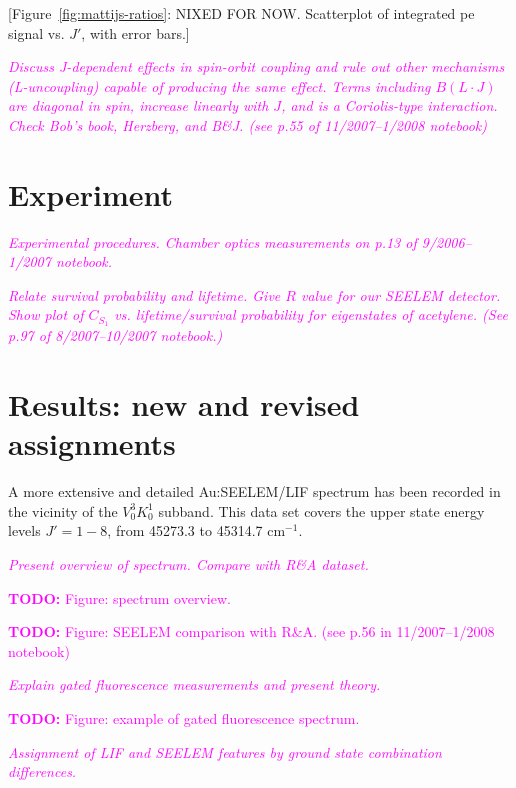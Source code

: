 \documentclass[12pt]{mitthesis}
\newcommand{\TODO} [1]{\textcolor{magenta}{\textbf{TODO:} #1}}
\newcommand{\POINT}[1]{\textcolor{magenta}{\emph{#1}}}
\newcommand{\rcm}{cm$^{-1}$}
\begin{document}
[Figure~\ref{fig:mattijs-ratios}: NIXED FOR NOW. Scatterplot of
integrated pe signal vs. $J'$, with error bars.]



\POINT{Discuss J-dependent effects in spin-orbit coupling and rule out
  other mechanisms (L-uncoupling) capable of producing the same
  effect. Terms including $B(L \cdot J)$ are diagonal in spin,
  increase linearly with $J$, and is a Coriolis-type interaction.
  Check Bob's book, Herzberg, and B\&J.  (see p.55 of 11/2007--1/2008
  notebook)}



\section{Experiment}

\POINT{Experimental procedures.  Chamber optics measurements on p.13
  of 9/2006--1/2007 notebook.}

\POINT{Relate survival probability and lifetime. Give $R$ value for
  our SEELEM detector.  Show plot of $C_{S_1}$ vs. lifetime/survival
  probability for eigenstates of acetylene.  (See p.97 of
  8/2007--10/2007 notebook.)}

\section{Results: new and revised assignments}

A more extensive and detailed Au:SEELEM/LIF spectrum has been recorded
in the vicinity of the $V^3_0K^1_0$ subband. This data set covers the
upper state energy levels $J'=1-8$, from 45273.3 to 45314.7 \rcm.

\POINT{Present overview of spectrum.  Compare with R\&A dataset.}

\TODO{Figure: spectrum overview.}

\TODO{Figure: SEELEM comparison with R\&A. (see p.56 in
  11/2007--1/2008 notebook)}

\POINT{Explain gated fluorescence measurements and present theory.}

\TODO{Figure: example of gated fluorescence spectrum.}

\POINT{Assignment of LIF and SEELEM features by ground state
  combination differences.}
\end{document}
